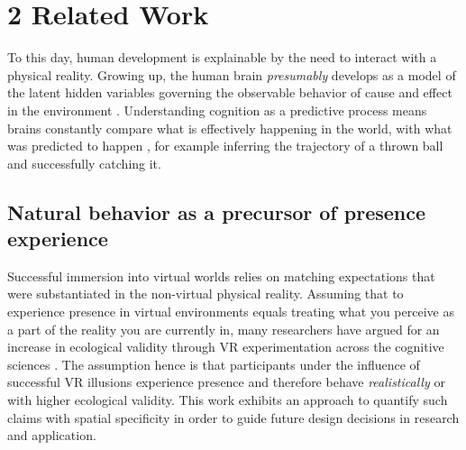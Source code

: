\section{2 Related Work}
To this day, human development is explainable by the need to interact with a physical reality. Growing up, the human brain \textit{presumably} develops as a model of the latent hidden variables governing the observable behavior of cause and effect in the environment \cite{Friston2010}. Understanding cognition as a predictive process means brains constantly compare what is effectively happening in the world, with what was predicted to happen \cite{Clark2013}, for example inferring the trajectory of a thrown ball and successfully catching it.

\subsection{Natural behavior as a precursor of presence experience}
Successful immersion into virtual worlds relies on matching expectations that were substantiated in the non-virtual physical reality. Assuming that to experience presence in virtual environments equals treating what you perceive as a part of the reality you are currently in, many researchers have argued for an increase in ecological validity through VR experimentation across the cognitive sciences \cite{Bohil2011, Parsons2015, Parsons2017}. The assumption hence is that participants under the influence of successful VR illusions experience presence and therefore behave \textit{realistically} or with higher ecological validity. This work exhibits an approach to quantify such claims with spatial specificity in order to guide future design decisions in research and application.

